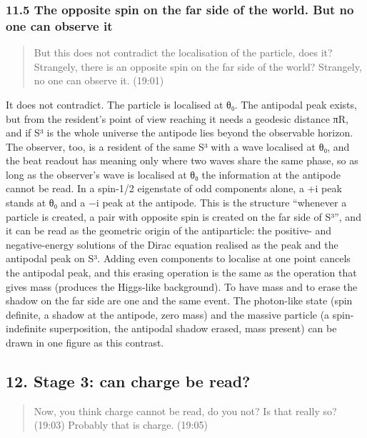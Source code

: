 \documentclass[
  a4paper,
]{article}
\begin{document}
\subsubsection{11.5 The opposite spin on the far side of the world. But
no one can observe
it}\label{the-opposite-spin-on-the-far-side-of-the-world.-but-no-one-can-observe-it}

\begin{quote}
But this does not contradict the localisation of the particle, does it?
Strangely, there is an opposite spin on the far side of the world?
Strangely, no one can observe it. (19:01)
\end{quote}

It does not contradict. The particle is localised at θ₀. The antipodal
peak exists, but from the resident's point of view reaching it needs a
geodesic distance πR, and if S³ is the whole universe the antipode lies
beyond the observable horizon. The observer, too, is a resident of the
same S³ with a wave localised at θ₀, and the beat readout has meaning
only where two waves share the same phase, so as long as the observer's
wave is localised at θ₀ the information at the antipode cannot be read.
In a spin-1/2 eigenstate of odd components alone, a +i peak stands at θ₀
and a −i peak at the antipode. This is the structure ``whenever a
particle is created, a pair with opposite spin is created on the far
side of S³'', and it can be read as the geometric origin of the
antiparticle: the positive- and negative-energy solutions of the Dirac
equation realised as the peak and the antipodal peak on S³. Adding even
components to localise at one point cancels the antipodal peak, and this
erasing operation is the same as the operation that gives mass (produces
the Higgs-like background). To have mass and to erase the shadow on the
far side are one and the same event. The photon-like state (spin
definite, a shadow at the antipode, zero mass) and the massive particle
(a spin-indefinite superposition, the antipodal shadow erased, mass
present) can be drawn in one figure as this contrast.

\subsection{12. Stage 3: can charge be
read?}\label{stage-3-can-charge-be-read}

\begin{quote}
Now, you think charge cannot be read, do you not? Is that really so?
(19:03) Probably that is charge. (19:05)
\end{quote}
\end{document}
